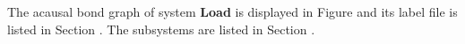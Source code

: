 

   The acausal bond graph of system \textbf{Load} is
   displayed in Figure  and its label
   file is listed in Section .
   The subsystems are listed in Section .
